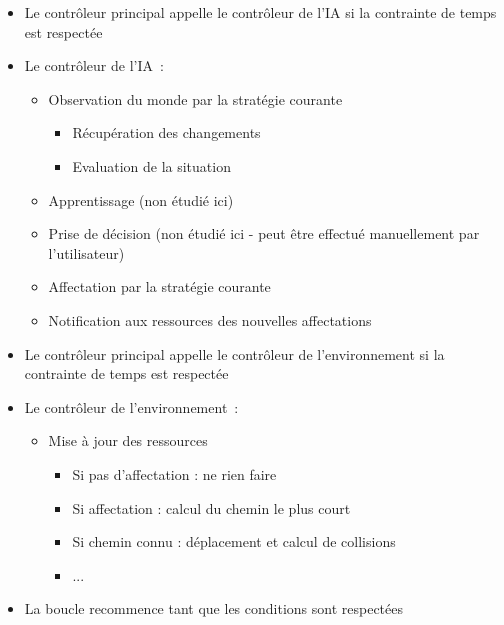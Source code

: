 	\begin{itemize}
	\setlength{\itemsep}{5pt}
	\item Le contrôleur principal appelle le contrôleur de l'IA si la contrainte de temps est respectée
	\item Le contrôleur de l'IA~:
		\begin{itemize}
		\setlength{\itemsep}{2pt}
		\item Observation du monde par la stratégie courante
		    \begin{itemize}
		    \item Récupération des changements
		    \item Evaluation de la situation
		    \end{itemize}
		\item Apprentissage (non étudié ici)
		\item Prise de décision (non étudié ici - peut être effectué manuellement par l'utilisateur)
		\item Affectation par la stratégie courante
		\item Notification aux ressources des nouvelles affectations
		\end{itemize}
	\item Le contrôleur principal appelle le contrôleur de l'environnement si la contrainte de temps est respectée
	\item Le contrôleur de l'environnement~:
		\begin{itemize}
		\item Mise à jour des ressources
		    \begin{itemize}
		    \item Si pas d'affectation : ne rien faire
		    \item Si affectation : calcul du chemin le plus court
		    \item Si chemin connu : déplacement et calcul de collisions
		    \item ...
		    \end{itemize}
		\end{itemize}
	\item La boucle recommence tant que les conditions sont respectées
	\end{itemize}
%
